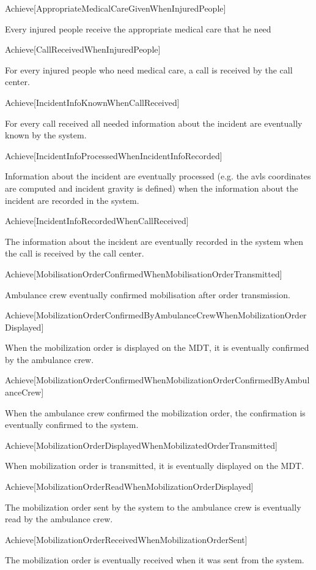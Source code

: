 Achieve[AppropriateMedicalCareGivenWhenInjuredPeople]

Every injured people receive the appropriate medical care that he need


Achieve[CallReceivedWhenInjuredPeople]

For every injured people who need medical care, a call is received by the call center.


Achieve[IncidentInfoKnownWhenCallReceived]

For every call received all needed information about the incident are eventually known by the system.


Achieve[IncidentInfoProcessedWhenIncidentInfoRecorded]

Information about the incident are eventually processed (e.g. the avls coordinates are computed and incident gravity is defined) when the information about the incident are recorded in the system.


Achieve[IncidentInfoRecordedWhenCallReceived]

The information about the incident are eventually recorded in the system when the call is received by the call center.


Achieve[MobilisationOrderConfirmedWhenMobilisationOrderTransmitted]

Ambulance crew eventually confirmed mobilisation after order transmission.


Achieve[MobilizationOrderConfirmedByAmbulanceCrewWhenMobilizationOrderDisplayed]

When the mobilization order is displayed on the MDT, it is eventually confirmed by the ambulance crew.
 

Achieve[MobilizationOrderConfirmedWhenMobilizationOrderConfirmedByAmbulanceCrew]

When the ambulance crew confirmed the mobilization order, the confirmation is eventually confirmed to the system. 


Achieve[MobilizationOrderDisplayedWhenMobilizatedOrderTransmitted]

When mobilization order is transmitted, it is eventually displayed on the MDT.
 

Achieve[MobilizationOrderReadWhenMobilizationOrderDisplayed]

The mobilization order sent by the system to the ambulance crew is eventually read by the ambulance crew.


Achieve[MobilizationOrderReceivedWhenMobilizationOrderSent]

The mobilization order is eventually received when it was sent from the system.


